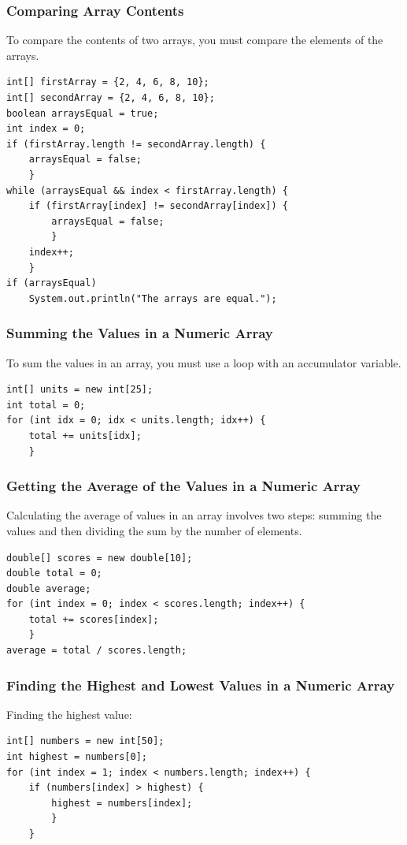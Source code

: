 \documentclass[11pt]{beamer}
\begin{document}
\begin{frame}[fragile]
    \frametitle{Comparing Array Contents}
    To compare the contents of two arrays, you must compare the elements of the arrays.
    \begin{lstlisting}[basicstyle=\ttfamily\footnotesize]
int[] firstArray = {2, 4, 6, 8, 10};
int[] secondArray = {2, 4, 6, 8, 10};
boolean arraysEqual = true;
int index = 0;
if (firstArray.length != secondArray.length) {
    arraysEqual = false;
    }
while (arraysEqual && index < firstArray.length) {
    if (firstArray[index] != secondArray[index]) {
        arraysEqual = false;
        }
    index++;
    }
if (arraysEqual)
    System.out.println("The arrays are equal.");
    \end{lstlisting}
\end{frame}

\begin{frame}[fragile]
    \frametitle{Summing the Values in a Numeric Array}
    To sum the values in an array, you must use a loop with an accumulator variable.
    \begin{lstlisting}
int[] units = new int[25];
int total = 0;
for (int idx = 0; idx < units.length; idx++) {
    total += units[idx];
    }
    \end{lstlisting}
\end{frame}

\begin{frame}[fragile]
    \frametitle{Getting the Average of the Values in a Numeric Array}
    Calculating the average of values in an array involves two steps: summing the values and then dividing the sum by the number of elements.
    \begin{lstlisting}
double[] scores = new double[10];
double total = 0;
double average;
for (int index = 0; index < scores.length; index++) {
    total += scores[index];
    }
average = total / scores.length;
    \end{lstlisting}
\end{frame}

\begin{frame}[fragile]
    \frametitle{Finding the Highest and Lowest Values in a Numeric Array}
    Finding the highest value:
    \begin{lstlisting}
int[] numbers = new int[50];
int highest = numbers[0];
for (int index = 1; index < numbers.length; index++) {
    if (numbers[index] > highest) {
        highest = numbers[index];
        }
    }
    \end{lstlisting}
\end{frame}
\end{document}
